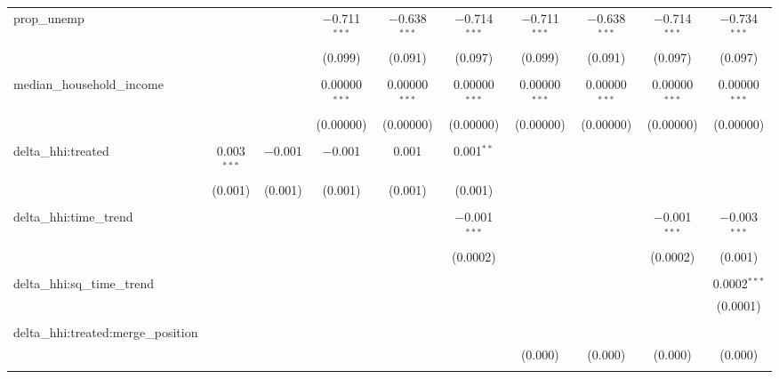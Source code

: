 \begin{table}[H]
{\begin{tabular}{@{\extracolsep{5pt}}lccccccccc}
  prop\_unemp &  &  & $-$0.711$^{***}$ & $-$0.638$^{***}$ & $-$0.714$^{***}$ & $-$0.711$^{***}$ & $-$0.638$^{***}$ & $-$0.714$^{***}$ & $-$0.734$^{***}$ \\  

   &  &  & (0.099) & (0.091) & (0.097) & (0.099) & (0.091) & (0.097) & (0.097) \\  

   & & & & & & & & & \\  

  median\_household\_income &  &  & 0.00000$^{***}$ & 0.00000$^{***}$ & 0.00000$^{***}$ & 0.00000$^{***}$ & 0.00000$^{***}$ & 0.00000$^{***}$ & 0.00000$^{***}$ \\  

   &  &  & (0.00000) & (0.00000) & (0.00000) & (0.00000) & (0.00000) & (0.00000) & (0.00000) \\  

   & & & & & & & & & \\  

  delta\_hhi:treated & 0.003$^{***}$ & $-$0.001 & $-$0.001 & 0.001 & 0.001$^{**}$ &  &  &  &  \\  

   & (0.001) & (0.001) & (0.001) & (0.001) & (0.001) &  &  &  &  \\  

   & & & & & & & & & \\  

  delta\_hhi:time\_trend &  &  &  &  & $-$0.001$^{***}$ &  &  & $-$0.001$^{***}$ & $-$0.003$^{***}$ \\  

   &  &  &  &  & (0.0002) &  &  & (0.0002) & (0.001) \\  

   & & & & & & & & & \\  

  delta\_hhi:sq\_time\_trend &  &  &  &  &  &  &  &  & 0.0002$^{***}$ \\  

   &  &  &  &  &  &  &  &  & (0.0001) \\  

   & & & & & & & & & \\  

  delta\_hhi:treated:merge\_position &  &  &  &  &  &  &  &  &  \\  

   &  &  &  &  &  & (0.000) & (0.000) & (0.000) & (0.000) \\  

   & & & & & & & & & \\  


\end{tabular}}
\end{table}
